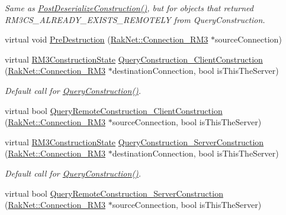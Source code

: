 \begin{DoxyCompactItemize}
\begin{DoxyCompactList}\small\item\em Same as \hyperlink{class_rak_net_1_1_replica3_a7d612c095fa5d81c1c6fabaa1a0f2501}{Post\-Deserialize\-Construction()}, but for objects that returned R\-M3\-C\-S\-\_\-\-A\-L\-R\-E\-A\-D\-Y\-\_\-\-E\-X\-I\-S\-T\-S\-\_\-\-R\-E\-M\-O\-T\-E\-L\-Y from Query\-Construction. \end{DoxyCompactList}\item 
virtual void \hyperlink{class_rak_net_1_1_replica3_ad517ffd842f11fe5cdef2678e87c86ab}{Pre\-Destruction} (\hyperlink{class_rak_net_1_1_connection___r_m3}{Rak\-Net\-::\-Connection\-\_\-\-R\-M3} $\ast$source\-Connection)
\item 
virtual \hyperlink{group___r_e_p_l_i_c_a___m_a_n_a_g_e_r___g_r_o_u_p3_ga16aaecf3c23582f0de6652b348ccfa38}{R\-M3\-Construction\-State} \hyperlink{class_rak_net_1_1_replica3_a98df31b4f30c6a6913963d6ecb8fea73}{Query\-Construction\-\_\-\-Client\-Construction} (\hyperlink{class_rak_net_1_1_connection___r_m3}{Rak\-Net\-::\-Connection\-\_\-\-R\-M3} $\ast$destination\-Connection, bool is\-This\-The\-Server)
\begin{DoxyCompactList}\small\item\em Default call for \hyperlink{class_rak_net_1_1_replica3_ad826e04ce6a0db4e32c3d990fd27e943}{Query\-Construction()}. \end{DoxyCompactList}\item 
virtual bool \hyperlink{class_rak_net_1_1_replica3_a8d72273c247770401da9d54b6bad4d16}{Query\-Remote\-Construction\-\_\-\-Client\-Construction} (\hyperlink{class_rak_net_1_1_connection___r_m3}{Rak\-Net\-::\-Connection\-\_\-\-R\-M3} $\ast$source\-Connection, bool is\-This\-The\-Server)
\item 
virtual \hyperlink{group___r_e_p_l_i_c_a___m_a_n_a_g_e_r___g_r_o_u_p3_ga16aaecf3c23582f0de6652b348ccfa38}{R\-M3\-Construction\-State} \hyperlink{class_rak_net_1_1_replica3_a111ebc1ea1f9f11202ea15abb39fc329}{Query\-Construction\-\_\-\-Server\-Construction} (\hyperlink{class_rak_net_1_1_connection___r_m3}{Rak\-Net\-::\-Connection\-\_\-\-R\-M3} $\ast$destination\-Connection, bool is\-This\-The\-Server)
\begin{DoxyCompactList}\small\item\em Default call for \hyperlink{class_rak_net_1_1_replica3_ad826e04ce6a0db4e32c3d990fd27e943}{Query\-Construction()}. \end{DoxyCompactList}\item 
virtual bool \hyperlink{class_rak_net_1_1_replica3_af5d3b25a95bbd91020d035ce9f6476a9}{Query\-Remote\-Construction\-\_\-\-Server\-Construction} (\hyperlink{class_rak_net_1_1_connection___r_m3}{Rak\-Net\-::\-Connection\-\_\-\-R\-M3} $\ast$source\-Connection, bool is\-This\-The\-Server)

\end{DoxyCompactItemize}
